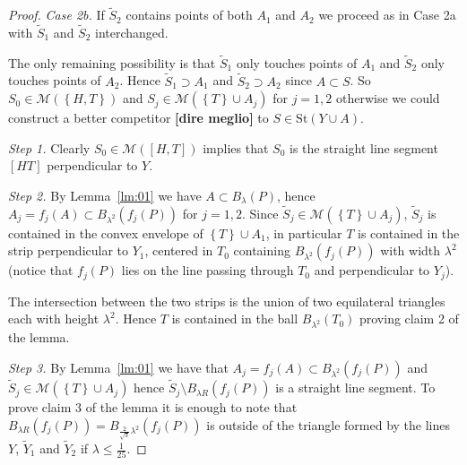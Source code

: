 \documentclass{article}
\newcommand{\Enclose}[1]{\left[#1\right]}
\newcommand{\ENCLOSE}[1]{\left\{#1\right\}}
\newcommand{\St}{\mathrm{St}}
\newcommand{\M}{\mathcal{M}}
\theoremstyle{definition}
\theoremstyle{remark}
\begin{document}
\begin{proof}
\emph{Case 2b.} If $\tilde S_2$ contains points of both 
$A_1$ and $A_2$ we proceed 
as in Case 2a with $\tilde S_1$ and $\tilde S_2$ interchanged.

The only remaining possibility is that $\tilde S_1$ 
only touches points of $A_1$ 
and $\tilde S_2$ only touches points of $A_2$. 
Hence $\tilde S_1\supset A_1$ and $\tilde S_2\supset A_2$ since $A\subset S$.
So $S_0\in \M(\ENCLOSE{H,T})$  
and $S_j \in \M(\ENCLOSE{T} \cup A_j)$ for $j=1,2$
otherwise we could construct a better competitor 
\textbf{[dire meglio]} to $S\in \St(Y\cup A)$.

\emph{Step 1.} 
Clearly $S_0\in \M(\Enclose{H,T})$ implies that $S_0$ is the straight 
line segment $[HT]$ perpendicular to $Y$.

\emph{Step 2.}
By Lemma~\ref{lm:01} we have $A\subset B_\lambda(P)$,
hence $A_j = f_j(A) \subset B_{\lambda^2}(f_j(P))$
for $j=1,2$.
Since $\tilde S_j \in \M(\ENCLOSE{T}\cup A_j)$, $\tilde S_j$ is contained 
in the convex envelope of $\ENCLOSE{T}\cup A_1$, in particular $T$ 
is contained in the strip perpendicular to $Y_1$, centered in $T_0$
containing $B_{\lambda^2}(f_j(P))$ with width $\lambda^2$ 
(notice that $f_j(P)$ lies on the line passing through $T_0$ and perpendicular 
to $Y_j$).

The intersection between the two strips is the union of two equilateral 
triangles each with height $\lambda^2$. 
Hence $T$ is contained in the ball 
$B_{\lambda^2}(T_0)$ proving claim 2 of the lemma.

\emph{Step 3.} 
By Lemma~\ref{lm:01} we have that $A_j=f_j(A)\subset B_{\lambda^2}(f_j(P))$
and $\tilde S_j \in \M(\ENCLOSE{T}\cup A_j)$
hence $\tilde S_j \setminus B_{\lambda R}(f_j(P))$ is a
straight line segment.
To prove claim 3 of the lemma it is enough to note that 
$B_{\lambda R}(f_j(P)) = B_{\frac{2}{\sqrt 3}\lambda^2}(f_j(P))$
is outside of the triangle formed by the lines $Y$, $\tilde Y_1$ 
and $\tilde Y_2$ if $\lambda\le \frac{1}{25}$.


\end{proof}
\end{document}
